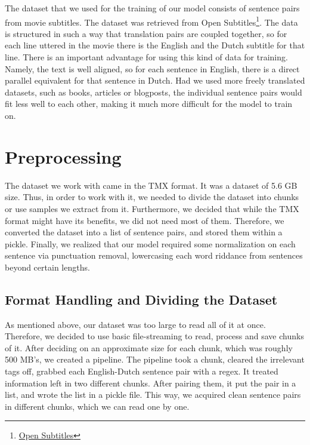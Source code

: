 \documentclass[11pt]{article}
\begin{document}
The dataset that we used for the training of our model consists of sentence pairs from movie subtitles. The dataset was retrieved from Open Subtitles\footnote[2]{\href{http://opus.nlpl.eu/OpenSubtitles-v2018.php}{Open Subtitles}}. The data is structured in such a way that translation pairs are coupled together, so for each line uttered in the movie there is the English and the Dutch subtitle for that line. There is an important advantage for using this kind of data for training. Namely, the text is well aligned, so for each sentence in English, there is a direct parallel equivalent for that sentence in Dutch. Had we used more freely translated datasets, such as books, articles or blogposts, the individual sentence pairs would fit less well to each other, making it much more difficult for the model to train on.

\section{Preprocessing}
The dataset we work with came in the TMX format. It was a dataset of 5.6 GB size. Thus, in order to work with it, we needed to divide the dataset into chunks or use samples we extract from it. Furthermore, we decided that while the TMX format might have its benefits, we did not need most of them. Therefore, we converted the dataset into a list of sentence pairs, and stored them within a pickle. Finally, we realized that our model required some normalization on each sentence via punctuation removal, lowercasing each word riddance from sentences beyond certain lengths.

\subsection{Format Handling and Dividing the Dataset}
As mentioned above, our dataset was too large to read all of it at once. Therefore, we decided to use basic file-streaming to read, process and save chunks of it. After deciding on an approximate size for each chunk, which was roughly 500 MB's, we created a pipeline. The pipeline took a chunk, cleared the irrelevant tags off, grabbed each English-Dutch sentence pair with a regex. It treated information left in two different chunks. After pairing them, it put the pair in a list, and wrote the list in a pickle file. This way, we acquired clean sentence pairs in different chunks, which we can read one by one.
\end{document}
